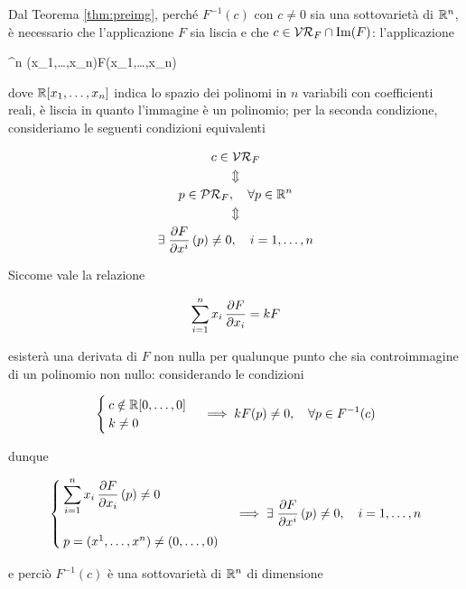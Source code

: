 {Dal Teorema \ref{thm:preimg}, perché $ F^{-1}(c) $ con $ c \neq 0 $ sia una sottovarietà di $ \mathbb{R}^{n} $, è necessario che l'applicazione $ F $ sia liscia e che $ c \in \mathcal{VR}_{F} \cap \Im(F) $: l'applicazione

	{\R^{n}}{\R}
	{(x_{1},\dots,x_{n})}{F(x_{1},\dots,x_{n}) \in \R[x_{1},\dots,x_{n}]}

dove $ \mathbb{R}[x_{1},\dots,x_{n}] $ indica lo spazio dei polinomi in $ n $ variabili con coefficienti reali, è liscia in quanto l'immagine è un polinomio; per la seconda condizione, consideriamo le seguenti condizioni equivalenti

\begin{gather}
	c \in \VR_{F} \nonumber \\
	\Updownarrow \nonumber \\
	p \in \PR_{F} \qcomma \forall p \in \R^{n} \\
	\Updownarrow \nonumber \\
	\E \pdv{F}{x^{i}} \, (p) \neq 0 \qcomma i=1,\dots,n \nonumber
\end{gather}

Siccome vale la relazione

\begin{equation}
	\sum_{i=1}^{n} x_{i} \, \pdv{F}{x_{i}} = k F
\end{equation}

esisterà una derivata di $ F $ non nulla per qualunque punto che sia controimmagine di un polinomio non nullo: considerando le condizioni

\begin{equation}
	\begin{cases}
		c \notin \R[0,\dots,0] \\
		k \neq 0
	\end{cases} %
	\implies %
	k F(p) \neq 0 \qcomma \forall p \in F^{-1}(c)
\end{equation}

dunque

\begin{equation}
	\begin{cases}
		\displaystyle \sum_{i=1}^{n} x_{i} \, \pdv{F}{x_{i}} \, (p) \neq 0 \\ \\
		p = (x^{1},\dots,x^{n}) \neq (0,\dots,0)
	\end{cases} %
	\implies %
	\E \pdv{F}{x^{i}} \, (p) \neq 0 \qcomma i=1,\dots,n
\end{equation}

e perciò $ F^{-1}(c) $ è una sottovarietà di $ \mathbb{R}^{n} $ di dimensione

}
